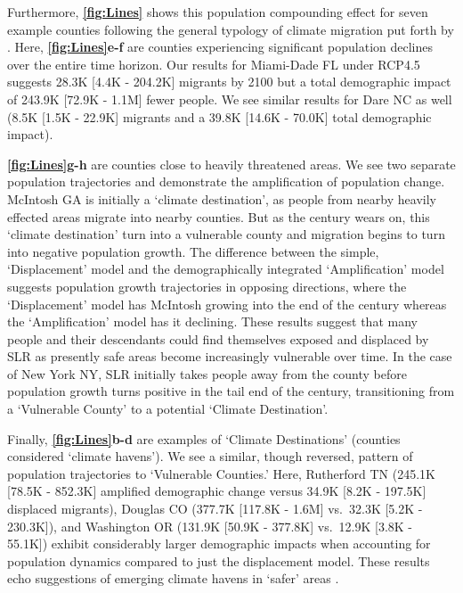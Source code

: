 \documentclass[12pt]{article}
\begin{document}
Furthermore, \textbf{\autoref{fig:Lines}} shows this population
compounding effect for seven example counties following the general
typology of climate migration put forth by
\citep{marandi2021vulnerable}. Here, \textbf{\autoref{fig:Lines}e-f} are
counties experiencing significant population declines over the entire
time horizon. Our results for Miami-Dade FL under RCP4.5 suggests
28.3K [4.4K - 204.2K]{} migrants by 2100 but a total demographic impact
of 243.9K [72.9K - 1.1M]{} fewer people. We see similar results for Dare
NC as well (8.5K [1.5K - 22.9K]{} migrants and a 39.8K [14.6K - 70.0K]{}
total demographic impact).

\textbf{\autoref{fig:Lines}g-h} are counties close to heavily threatened
areas. We see two separate population trajectories and demonstrate the
amplification of population change. McIntosh GA is initially a `climate
destination', as people from nearby heavily effected areas migrate into
nearby counties. But as the century wears on, this `climate destination'
turn into a vulnerable county and migration begins to turn into negative
population growth. The difference between the simple, `Displacement'
model and the demographically integrated `Amplification' model suggests
population growth trajectories in opposing directions, where the
`Displacement' model has McIntosh growing into the end of the century
whereas the `Amplification' model has it declining. These results
suggest that many people and their descendants could find themselves
exposed and displaced by SLR as presently safe areas become increasingly
vulnerable over time. In the case of New York NY, SLR initially takes
people away from the county before population growth turns positive in
the tail end of the century, transitioning from a `Vulnerable County' to
a potential `Climate Destination'.

Finally, \textbf{\autoref{fig:Lines}b-d} are examples of `Climate
Destinations' (counties considered `climate havens'). We see a similar,
though reversed, pattern of population trajectories to `Vulnerable
Counties.' Here, Rutherford TN (245.1K [78.5K - 852.3K]{} amplified
demographic change versus 34.9K [8.2K - 197.5K]{} displaced migrants),
Douglas CO (377.7K [117.8K - 1.6M]{} vs.~32.3K [5.2K - 230.3K]), and
Washington OR (131.9K [50.9K - 377.8K]{} vs.~12.9K [3.8K - 55.1K])
exhibit considerably larger demographic impacts when accounting for
population dynamics compared to just the displacement model. These
results echo suggestions of emerging climate havens in `safer' areas
\citep{marandi2021vulnerable}.
\end{document}
